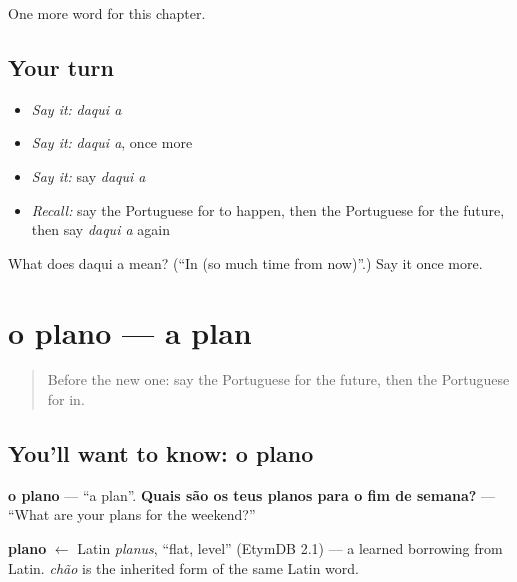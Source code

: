 \begin{grammarlens}[title={What you've built}]
One more word for this chapter.
\end{grammarlens}

\subsection*{Your turn}
\begin{itemize}
\raggedright
  \item \emph{Say it:} \emph{daqui a}
  \item \emph{Say it:} \emph{daqui a}, once more
  \item \emph{Say it:} say \emph{daqui a}
  \item \emph{Recall:} say the Portuguese for to happen, then the Portuguese for the future, then say \emph{daqui a} again
\end{itemize}

\begin{tcolorbox}[breakable,colback=teal!4,colframe=teal!35!black,title={Before you move on}]
What does daqui a mean? (\textquotedblleft{}In (so much time from now)\textquotedblright{}.) Say it once more.
\end{tcolorbox}
\section[o plano]{o plano — a plan}

\label{lesson:PT-C136-o-plano}



\begin{quote}
Before the new one: say the Portuguese for the future, then the Portuguese for in.
\end{quote}

\subsection*{You'll want to know: o plano}
\textbf{o plano} — \textquotedblleft{}a plan\textquotedblright{}. \textbf{Quais são os teus planos para o fim de semana?} — \textquotedblleft{}What are your plans for the weekend?\textquotedblright{}

\begin{cousinweb}
\textbf{plano} $\leftarrow$ Latin \emph{planus}, \textquotedblleft{}flat, level\textquotedblright{} (EtymDB 2.1) — a learned borrowing from Latin. \emph{chão} is the inherited form of the same Latin word.
\end{cousinweb}


